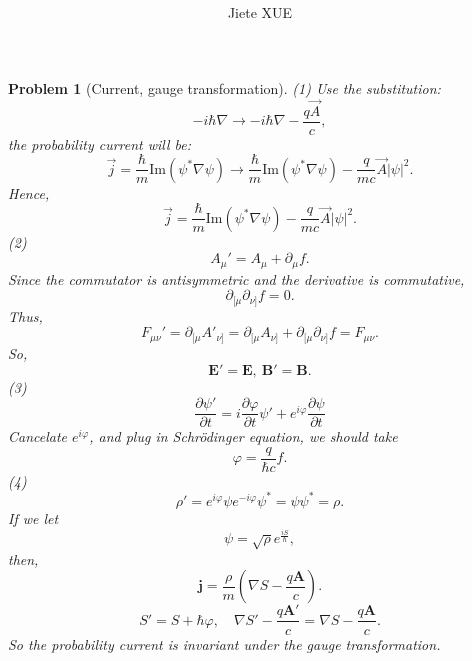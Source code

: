 \documentclass{article}
\title{\textbf{\mytitle}}
\author{Jiete XUE}
\date{\mydate}
\theoremstyle{1}
\newtheorem{problem}{Problem}
\newcommand{\pa}{\partial}
\begin{document}
\maketitle
\begin{problem}[Current, gauge transformation]
    (1) Use the substitution:
    \begin{equation}
        -i\hbar \nabla\longrightarrow -i\hbar \nabla -\frac{q\vec{A}}{c},
    \end{equation}
    the probability current will be:
    \begin{equation}
        \vec{j}=\frac{\hbar}{m}\mathrm{Im}\left(\psi^*\nabla \psi\right)\longrightarrow\frac{\hbar}{m}\mathrm{Im}\left(\psi^*\nabla \psi\right)-\frac{q}{mc} \vec{A}\left|\psi\right|^2.
    \end{equation}
    Hence,
    \begin{equation}
        \boxed{\vec{j}=\frac{\hbar}{m}\mathrm{Im}\left(\psi^*\nabla \psi\right)-\frac{q}{mc} \vec{A}\left|\psi\right|^2.}
    \end{equation}
    (2) 
    \begin{equation}
        A_\mu'=A_\mu+\pa_\mu f.
    \end{equation}
    Since the commutator is antisymmetric and the derivative is commutative,
    \begin{equation}
        \pa_{[\mu}\pa_{\nu]}f=0.
    \end{equation}
    Thus,
    \begin{equation}
        F_{\mu\nu}'=\pa_{[\mu}A'_{\nu]}=\pa_{[\mu}A_{\nu]}+\pa_{[\mu}\pa_{\nu]}f=F_{\mu\nu}.
    \end{equation}
    So, 
    \begin{equation}
        \mathbf{E}'=\mathbf{E},\ \mathbf{B}'=\mathbf{B}.
    \end{equation}
    (3) 
    \begin{equation}
        \frac{\pa \psi'}{\pa t}=i\frac{\pa \varphi}{\pa t}\psi'+e^{i\varphi}\frac{\pa \psi}{\pa t}
    \end{equation}
    Cancelate  $e^{i\varphi}$, and plug in Schrödinger equation, we should take
    \begin{equation}
        \boxed{\varphi=\frac{q}{\hbar c}f.}
    \end{equation}
    (4)
    \begin{equation}
        \rho'=e^{i\varphi}\psi e^{-i\varphi}\psi^*=\psi\psi^*=\rho.
    \end{equation}
    If we let 
    \begin{equation}
        \psi=\sqrt{\rho}e^{\frac{iS}{\hbar}},
    \end{equation}
    then,
    \begin{equation}
        \mathbf{j}=\frac{\rho}{m}\left(\nabla S-\frac{q\mathbf{A}}{c}\right).
    \end{equation}
    \begin{equation}
       S'=S+\hbar \varphi,\quad  \nabla S'-\frac{q\mathbf{A}'}{c}=\nabla S-\frac{q\mathbf{A}}{c}.
    \end{equation}
    So the probability current  is invariant under the gauge transformation.
    
\end{problem}
\end{document}
